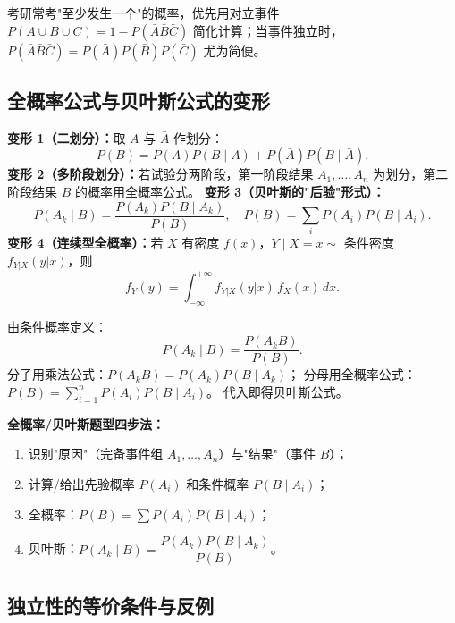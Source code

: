 \documentclass[11pt,a4paper]{article}
\begin{document}
\begin{examtip}[考点提示]
考研常考"至少发生一个"的概率，优先用对立事件 $P(A\cup B\cup C)=1-P(\bar A\bar B\bar C)$ 简化计算；当事件独立时，$P(\bar A\bar B\bar C)=P(\bar A)P(\bar B)P(\bar C)$ 尤为简便。
\end{examtip}

\subsection{全概率公式与贝叶斯公式的变形}

\begin{variation}[完备事件组的常见选取]
\textbf{变形 1（二划分）：}取 $A$ 与 $\bar A$ 作划分：
\[
P(B) = P(A)P(B\mid A) + P(\bar A)P(B\mid \bar A).
\]
\textbf{变形 2（多阶段划分）：}若试验分两阶段，第一阶段结果 $A_1,\dots,A_n$ 为划分，第二阶段结果 $B$ 的概率用全概率公式。
\textbf{变形 3（贝叶斯的"后验"形式）：}
\[
P(A_k\mid B) = \frac{P(A_k)P(B\mid A_k)}{P(B)}, \quad P(B)=\sum_i P(A_i)P(B\mid A_i).
\]
\textbf{变形 4（连续型全概率）：}若 $X$ 有密度 $f(x)$，$Y\mid X=x \sim$ 条件密度 $f_{Y|X}(y|x)$，则
\[
f_Y(y) = \int_{-\infty}^{+\infty} f_{Y|X}(y|x)\,f_X(x)\,dx.
\]
\end{variation}

\begin{derivation}[贝叶斯公式推导]
由条件概率定义：
\[
P(A_k\mid B) = \frac{P(A_k B)}{P(B)}.
\]
分子用乘法公式：$P(A_k B)=P(A_k)P(B\mid A_k)$；
分母用全概率公式：$P(B)=\sum_{i=1}^n P(A_i)P(B\mid A_i)$。
代入即得贝叶斯公式。
\end{derivation}

\begin{keypoint}[解题模板]
\textbf{全概率/贝叶斯题型四步法：}
\begin{enumerate}[leftmargin=2em]
  \item 识别"原因"（完备事件组 $A_1,\dots,A_n$）与"结果"（事件 $B$）；
  \item 计算/给出先验概率 $P(A_i)$ 和条件概率 $P(B\mid A_i)$；
  \item 全概率：$P(B)=\sum P(A_i)P(B\mid A_i)$；
  \item 贝叶斯：$P(A_k\mid B)=\dfrac{P(A_k)P(B\mid A_k)}{P(B)}$。
\end{enumerate}
\end{keypoint}

\subsection{独立性的等价条件与反例}
\end{document}
